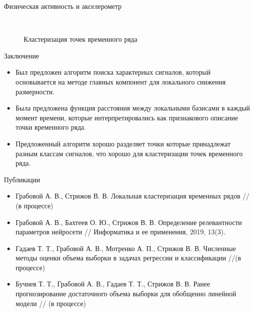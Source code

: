\documentclass{beamer}
\begin{document}
\begin{frame}{Физическая активность и акселерометр}
	\begin{figure}[h!t]\center
		\\
		\caption{Кластеризация точек временного ряда}
	\end{figure}
\end{frame}
\begin{frame}{Заключение}
	\begin{itemize}
		\item Был предложен алгоритм поиска характерных сигналов, который основывается на методе главных компонент для локального снижения размерности.
		\item Была предложена функция расстояния между локальными базисами в каждый момент времени, которые интерпретировались как признакового описание точки временного ряда.
		\item Предложенный алгоритм хорошо разделяет точки которые принадлежат разным классам сигналов, что хорошо для кластеризации точек временного ряда.
	\end{itemize}
\end{frame}
\begin{frame}{Публикации}
	\begin{itemize}
		\item Грабовой А. В., Стрижов В. В. Локальная кластеризация временных рядов // (в процессе)
		\item Грабовой А. В., Бахтеев О. Ю., Стрижов В. В. Определение релевантности параметров нейросети // Информатика и ее применения, 2019, 13(3).
		\item Гадаев Т. Т., Грабовой А. В., Мотренко А. П., Стрижов В. В. Численные методы оценки объема выборки в задачах регрессии и классификации //(в процессе)
		\item Бучнев Т. Т., Грабовой А. В., Гадаев Т. Т., Стрижов В. В. Ранее прогнозирование достаточного объема выборки для обобщенно линейной модели // (в процессе)
	\end{itemize}
\end{frame}
\end{document}

